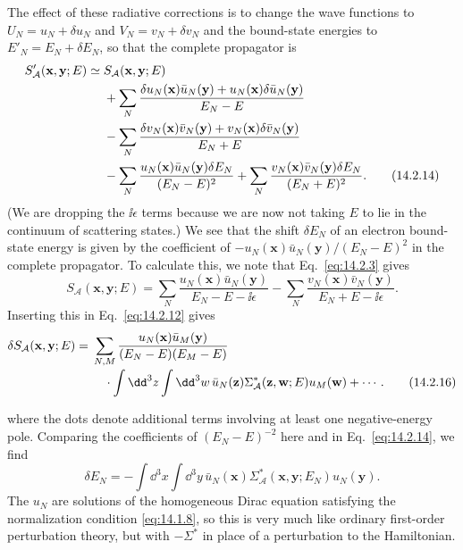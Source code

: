 The effect of these radiative corrections is to change the wave functions to
$U_N=u_N+\delta u_N$ and $V_N=v_N+\delta v_N$ and the bound-state energies to
$E'_N=E_N+\delta E_N$, so that the complete propagator is
\begin{align}
 S'_{\mathcal A}(\mathbf x,\mathbf y;E)\simeq{}&S_{\mathcal A}(\mathbf x,\mathbf y;E)
 \notag\\
 &+\sum_N\frac{\delta u_N(\mathbf x)\bar u_N(\mathbf y)
 +u_N(\mathbf x)\delta\bar u_N(\mathbf y)}{E_N-E}
 \notag\\
 &-\sum_N\frac{\delta v_N(\mathbf x)\bar v_N(\mathbf y)
 +v_N(\mathbf x)\delta\bar v_N(\mathbf y)}{E_N+E}
 \notag\\
 &-\sum_N\frac{u_N(\mathbf x)\bar u_N(\mathbf y)\delta E_N}{(E_N-E)^2}
 +\sum_N\frac{v_N(\mathbf x)\bar v_N(\mathbf y)\delta E_N}{(E_N+E)^2}.
 \tag{14.2.14}\label{eq:14.2.14}
\end{align}
(We are dropping the $\ii\epsilon$ terms because we are now not taking $E$ to lie
in the continuum of scattering states.) We see that the shift $\delta E_N$ of
an electron bound-state energy is given by the coefficient of
$-u_N(\mathbf x)\bar u_N(\mathbf y)/(E_N-E)^2$ in the complete propagator. To
calculate this, we note that Eq.~\eqref{eq:14.2.3} gives
\begin{equation}
 S_{\mathcal A}(\mathbf x,\mathbf y;E)
 =\sum_N\frac{u_N(\mathbf x)\bar u_N(\mathbf y)}{E_N-E-\ii\epsilon}
 -\sum_N\frac{v_N(\mathbf x)\bar v_N(\mathbf y)}{E_N+E-\ii\epsilon}.
 \tag{14.2.15}\label{eq:14.2.15}
\end{equation}
Inserting this in Eq.~\eqref{eq:14.2.12} gives
\begin{align}
 \delta S_{\mathcal A}(\mathbf x,\mathbf y;E)={}&
 \sum_{N,M}\frac{u_N(\mathbf x)\bar u_M(\mathbf y)}{(E_N-E)(E_M-E)}
 \notag\\[-2pt]
 &\quad\cdot\int \dd^3z\int \dd^3w\,
 \bar u_N(\mathbf z)\Sigma^*_{\mathcal A}(\mathbf z,\mathbf w;E)
 u_M(\mathbf w)+\cdots .
 \tag{14.2.16}\label{eq:14.2.16}
\end{align}



where the dots denote additional terms involving at least one negative-energy
pole. Comparing the coefficients of $(E_N-E)^{-2}$ here and in
Eq.~\eqref{eq:14.2.14}, we find
\begin{equation}
 \delta E_N=-\int \dd^3x\int \dd^3y\,
 \bar u_N(\mathbf x)\Sigma^*_{\mathcal A}(\mathbf x,\mathbf y;E_N)u_N(\mathbf y).
 \tag{14.2.17}\label{eq:14.2.17}
\end{equation}
The $u_N$ are solutions of the homogeneous Dirac equation satisfying the
normalization condition \eqref{eq:14.1.8}, so this is very much like ordinary
first-order perturbation theory, but with $-\Sigma^*$ in place of a perturbation
to the Hamiltonian.

